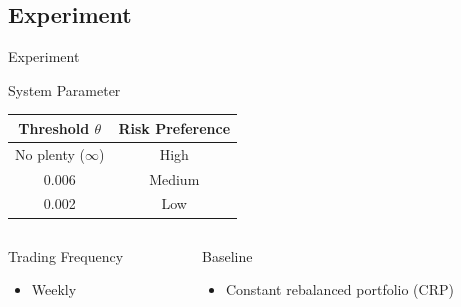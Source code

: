 \subsection{Experiment}
\begin{frame}{Experiment}
\begin{block}{System Parameter}
    \centering
    \begin{tabular}{||c|c||}
    \hline \hline
    Threshold $\theta$ & Risk Preference \\ \hline
    No plenty ($\infty$) & High \\ \hline
    0.006 & Medium      \\ \hline
    0.002 & Low      \\ \hline \hline
    \end{tabular}
\end{block}
\begin{columns}[t]
    \begin{column}{0.45\textwidth}
    
    \begin{block}{Trading Frequency}
    \begin{itemize}
        \item  Weekly
    \end{itemize}
    \end{block}
    \end{column}
    \begin{column}{0.45\textwidth}
    \begin{block}{Baseline}
    \begin{itemize}
        \item  Constant rebalanced portfolio (CRP)
    \end{itemize}
    \end{block}
    \end{column}
\end{columns}



\end{frame}

